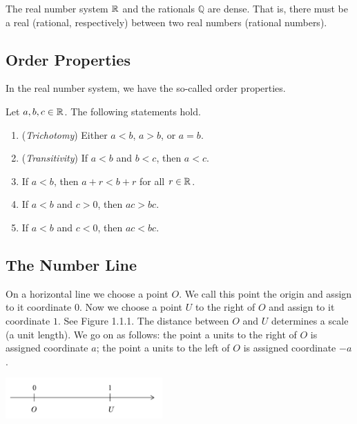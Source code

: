 \documentclass[11pt]{book}
\begin{document}
\begin{proposition}
    The real number system $\mathbb{R}$ and the rationals $\mathbb{Q}$ are dense. That is, there must be a real (rational, respectively) between two real numbers (rational numbers).
\end{proposition}

\subsection*{Order Properties}

In the real number system, we have the so-called order properties. 

\begin{theorem}
    Let $a, b, c\in\mathbb{R}$. The following statements hold.
    \begin{enumerate}
        \item (\textit{Trichotomy}) Either $a<b$, $a>b$, or $a=b$.
        \item (\textit{Transitivity}) If $a<b$ and $b<c$, then $a<c$.
        \item If $a<b$, then $a+r<b+r$ for all $r\in\mathbb{R}$.
        \item If $a<b$ and $c>0$, then $ac>bc$.
        \item If $a<b$ and $c<0$, then $ac<bc$.
    \end{enumerate}
\end{theorem}

\subsection*{The Number Line}

On a horizontal line we choose a point $O$. We call this point the origin and assign to it coordinate $0$. Now we choose a point $U$ to the right of $O$ and assign to it coordinate $1$. See Figure 1.1.1. The distance between $O$ and $U$ determines a scale (a unit length). We go on as follows: the point a units to the right of $O$ is assigned coordinate $a$; the point a units to the left of $O$ is assigned coordinate $-a$.

\begin{center}
    \includegraphics[width=0.45\textwidth]{number_line.PNG}
\end{center}
\end{document}
